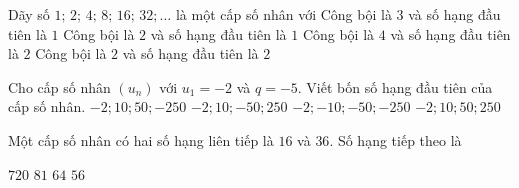 \begin{ex}%
Dãy số $1 ;\, 2 ;\, 4 ;\, 8 ;\, 16 ;\, 32 ; \ldots$ là một cấp số nhân với
\choice
{Công bội là $3$ và số hạng đầu tiên là $1$}
{\True Công bội là $2$ và số hạng đầu tiên là $1$}
{Công bội là $4$ và số hạng đầu tiên là $2$}
{Công bội là $2$ và số hạng đầu tiên là $2$}
\end{ex}

\begin{ex}%
Cho cấp số nhân $\left(u_n\right)$ với $u_1=-2$ và $q=-5$. Viết bốn số hạng đầu tiên của cấp số nhân.
\choice
{$-2 ; 10 ; 50 ;-250$}
{\True $-2 ; 10 ;-50 ; 250$}
{$-2 ;-10 ;-50 ;-250$}
{$-2 ; 10 ; 50 ; 250$}
\end{ex}
\begin{ex}%
Một cấp số nhân có hai số hạng liên tiếp là $16$ và $36$. Số hạng tiếp theo là

\choice
{$720$}
{\True $81$}
{$64$}
{$56$}
\end{ex}

